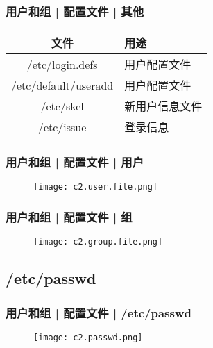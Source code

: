 \begin{frame}
  \frametitle{用户和组 | 配置文件 | 其他}
  \begin{table}
    \centering
    \begin{tabularx}{0.6\textwidth}{cX}
      \hline
      \rowcolor{blue!50}文件 & 用途\\
      \hline
      /etc/login.defs & 用户配置文件\\
      /etc/default/useradd & 用户配置文件\\
      /etc/skel & 新用户信息文件\\
      /etc/issue & 登录信息\\
      \hline
    \end{tabularx}
  \end{table}
\end{frame}

\begin{frame}
  \frametitle{用户和组 | 配置文件 | 用户}
  \begin{figure}
    \centering
    \texttt{[image: c2.user.file.png]}
  \end{figure}
\end{frame}

\begin{frame}
  \frametitle{用户和组 | 配置文件 | 组}
  \begin{figure}
    \centering
    \texttt{[image: c2.group.file.png]}
  \end{figure}
\end{frame}

\subsection{/etc/passwd}
\begin{frame}
  \frametitle{用户和组 | 配置文件 | /etc/passwd}
  \begin{figure}
    \centering
    \texttt{[image: c2.passwd.png]}
  \end{figure}
\end{frame}

